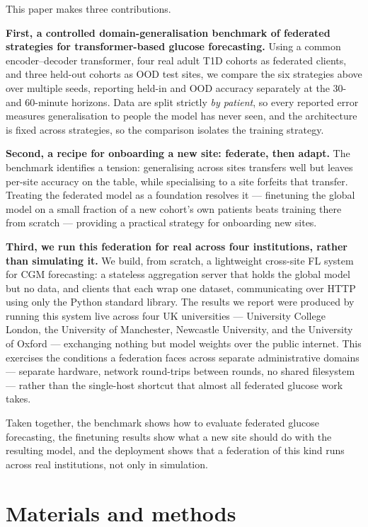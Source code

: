 \documentclass[10pt,letterpaper]{article}
\begin{document}
This paper makes three contributions.

\textbf{First, a controlled domain-generalisation benchmark of federated
strategies for transformer-based glucose forecasting.} Using a common
encoder--decoder transformer, four real adult T1D cohorts as federated
clients, and three held-out cohorts as OOD test sites, we compare the six
strategies above over multiple seeds, reporting held-in and OOD accuracy
separately at the 30- and 60-minute horizons. Data are split strictly
\emph{by patient}, so every reported error measures generalisation to
people the model has never seen, and the architecture is fixed across
strategies, so the comparison isolates the training strategy.

\textbf{Second, a recipe for onboarding a new site: federate, then adapt.} The
benchmark identifies a tension: generalising across sites transfers well but
leaves per-site accuracy on the table, while specialising to a site forfeits
that transfer. Treating the federated model as a foundation resolves it ---
finetuning the global model on a small fraction of a new cohort's own
patients beats training there from scratch --- providing a practical
strategy for onboarding new sites.

\textbf{Third, we run this federation for real across four institutions, rather
than simulating it.} We build, from scratch, a lightweight cross-site FL
system for CGM forecasting: a stateless aggregation server that holds the
global model but no data, and clients that each wrap one dataset,
communicating over HTTP using only the Python standard library. The results
we report were produced by running this system live across four UK
universities --- University College London, the University of Manchester,
Newcastle University, and the University of Oxford --- exchanging nothing
but model weights over the public internet. This exercises the conditions a
federation faces across separate administrative domains --- separate
hardware, network round-trips between rounds, no shared filesystem ---
rather than the single-host shortcut that almost all federated glucose work
takes.

Taken together, the benchmark shows how to evaluate federated glucose
forecasting, the finetuning results show what a new site should do with the
resulting model, and the deployment shows that a federation of this kind
runs across real institutions, not only in simulation.

\section*{Materials and methods}
\end{document}
